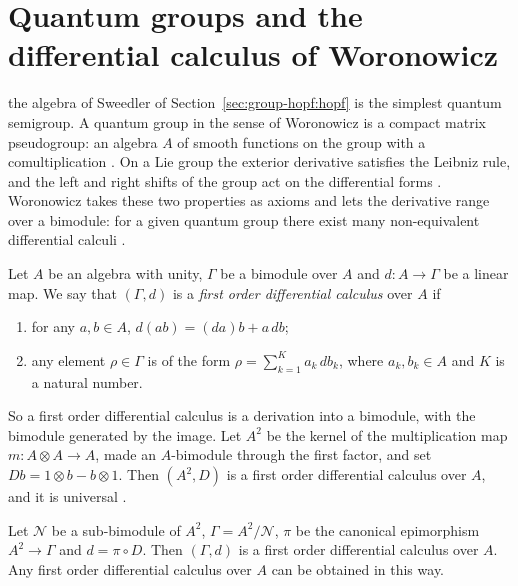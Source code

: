 \section{Quantum groups and the differential calculus of Woronowicz}\label{sec:group-hopf:quantum}

the algebra of Sweedler of Section~\ref{sec:group-hopf:hopf} is the simplest quantum
semigroup. A quantum group in the sense of Woronowicz is a compact matrix
pseudogroup: an algebra $A$ of smooth functions on the group with a comultiplication
\cite[p.~126]{Woronowicz1989}. On a Lie group the exterior derivative satisfies
the Leibniz rule, and the left and right shifts of the group act on the
differential forms \cite[pp.~126--127]{Woronowicz1989}. Woronowicz
takes these two properties as axioms and lets the derivative range over a bimodule:
for a given quantum group there exist many non-equivalent differential calculi
\cite[p.~126]{Woronowicz1989}.

\begin{definition}\label{def:group-hopf:fodc}
Let $A$ be an algebra with unity, $\Gamma$ be a bimodule over $A$ and
$d\colon A\to\Gamma$ be a linear map. We say that $(\Gamma,d)$ is a
\emph{first order differential calculus} over $A$ if
\begin{enumerate}
\item for any $a,b\in A$, $d(ab)=(da)b+a\,db$;
\item any element $\rho\in\Gamma$ is of the form $\rho=\sum_{k=1}^{K}a_k\,db_k$,
where $a_k,b_k\in A$ and $K$ is a natural number.
\end{enumerate}
\end{definition}

So a first order differential calculus is a derivation into a bimodule, with the
bimodule generated by the image. Let $A^2$ be the kernel of
the multiplication map $m\colon A\otimes A\to A$, made an $A$-bimodule through the
first factor, and set $Db=1\otimes b-b\otimes1$. Then $(A^2,D)$ is a first order
differential calculus over $A$, and it is universal
\cite[p.~128]{Woronowicz1989}.

\begin{proposition}\label{prop:group-hopf:universal}
Let $\mathcal{N}$ be a sub-bimodule of $A^2$, $\Gamma=A^2/\mathcal{N}$, $\pi$ be the
canonical epimorphism $A^2\to\Gamma$ and $d=\pi\circ D$. Then $(\Gamma,d)$ is a
first order differential calculus over $A$. Any first order differential calculus
over $A$ can be obtained in this way.
\end{proposition}

